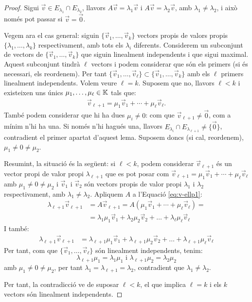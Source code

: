 \documentclass[
  11pt,
]{book}
\numberwithin{dummy}{section}
\theoremstyle{maincolornumbox}
\theoremstyle{blacknumex}
\theoremstyle{blacknumbox}
\theoremstyle{maincolornum}
\newlength\esp
\begin{document}
\begin{proof}
Sigui \(\vec v\in E_{\lambda_1}\cap E_{\lambda_2}\), llavors
\(A\vec v=\lambda_1\vec v\) i \(A\vec v=\lambda_2\vec v\), amb
\(\lambda_1\neq\lambda_2\), i això només pot passar si \(\vec v=\vec 0\).

Vegem ara el cas general: siguin \(\{\vec v_1, \dots, \vec v_k\}\) vectors
propis de valors propis \(\{\lambda_1, \dots, \lambda_k\}\)
respectivament, amb tots els \(\lambda_i\) diferents. Considerem un
subconjunt de vectors de \(\{\vec v_1, \dots, \vec v_k\}\) que siguin
linealment independents i que sigui maximal. Aquest subconjunt tindrà
\(\ell\) vectors i podem considerar que són els primers (si és necessari,
els reordenem). Per tant
\(\{\vec v_1, \dots, \vec v_\ell\}\subset\{\vec v_1, \dots, \vec v_k\}\)
amb els \(\ell\) primers linealment independents. Volem veure \(\ell=k\).
Suposem que no, llavors \(\ell<k\) i existeixen uns únics
\(\mu_1,\dots, \mu_\ell \in \mathbb{K}\) tals que: \begin{align*}
\label{eq:v-ellp1}
\vec v_{\ell+1}=\mu_1\vec v_1+ \cdots+ \mu_\ell\vec v_\ell.
\end{align*} També podem considerar que hi ha dues \(\mu_i\neq0\): com
que \(\vec v_{\ell+1}\neq\vec 0\), com a mínim n'hi ha una. Si només n'hi
hagués una, llavors
\(E_{\lambda_i}\cap E_{\lambda_{\ell+1}}\neq\{\vec 0\}\), contradient el
primer apartat d'aquest lema. Suposem doncs (si cal, reordenem),
\(\mu_1\neq0\neq\mu_2\).

Resumint, la situació és la següent: si \(\ell<k\), podem considerar
\(\vec v_{\ell+1}\) és un vector propi de valor propi \(\lambda_{\ell+1}\)
que es pot posar com
\(\vec v_{\ell+1}=\mu_1\vec v_1+ \cdots+ \mu_\ell\vec v_\ell\) amb
\(\mu_1\neq0\neq\mu_2\) i \(\vec v_1\) i \(\vec v_2\) són vectors propis de
valor propi \(\lambda_1\) i \(\lambda_2\) respectivament, amb
\(\lambda_1\neq\lambda_2\). Apliquem \(A\) a l'Equació
\eqref{eq:v-ellp1}: \begin{align*}
\lambda_{\ell+1}\vec v_{\ell+1} & =A\vec v_{\ell+1}=A(\mu_1\vec v_1+ \cdots+ \mu_\ell\vec v_\ell)= \\ & = \lambda_1\mu_1\vec v_1+\lambda_2\mu_2\vec v_2+\dots+\lambda_\ell\mu_\ell\vec v_\ell
\end{align*} I també: \begin{align*}
\lambda_{\ell+1}\vec v_{\ell+1} & = \lambda_{\ell+1}\mu_1\vec v_1+\lambda_{\ell+1}\mu_2\vec v_2+\dots+\lambda_{\ell+1}\mu_\ell\vec v_\ell
\end{align*} Per tant, com que \(\{\vec v_1, \dots, \vec v_\ell\}\) són
linealment independents, tenim:
\[\lambda_{\ell+1} \mu_1=\lambda_1\mu_1 \text{ i } \lambda_{\ell+1}\mu_2=\lambda_2\mu_2\]
amb \(\mu_1\neq0\neq\mu_2\), per tant
\(\lambda_1=\lambda_{\ell+1}=\lambda_2\), contradient que
\(\lambda_1\neq\lambda_2\).

Per tant, la contradicció ve de suposar \(\ell<k\), el que implica
\(\ell=k\) i els \(k\) vectors són linealment independents.
\end{proof}
\end{document}
